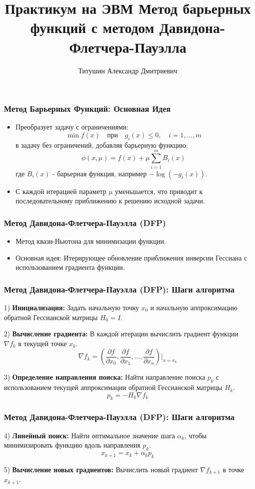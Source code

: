 \documentclass[12pt,pdf,hyperref={unicode}]{beamer}
\title{Практикум на ЭВМ Метод барьерных функций с методом Давидона-Флетчера-Пауэлла}
\author{Титушин Александр Дмитриевич}
\institute{группа 411}
\begin{document}
\newcommand\Rn{\R^n}

\frame{\maketitle}

\begin{frame}
\frametitle{Метод Барьерных Функций: Основная Идея}
\begin{itemize}
    \item Преобразует задачу с ограничениями:
    \[
    \min f(x) \quad \text{при} \quad g_i(x) \leq 0, \quad i=1,...,m
    \]
    в задачу без ограничений, добавляя барьерную функцию:
    \[
    \phi(x, \mu) = f(x) + \mu \sum_{i=1}^m B_i(x)
    \]
    где $B_i(x)$ - барьерная функция, например $-\log(-g_i(x))$.
    \item С каждой итерацией параметр $\mu$ уменьшается, что приводит к последовательному приближению к решению исходной задачи.
\end{itemize}
\end{frame}

\begin{frame}
\frametitle{Метод Давидона-Флетчера-Пауэлла (DFP)}
\begin{itemize}
    \item Метод квази-Ньютона для минимизации функции.
    \item Основная идея: Итерирующее обновление приближения инверсии Гессиана с использованием градиента функции.
\end{itemize}
\end{frame}

\begin{frame}
\frametitle{Метод Давидона-Флетчера-Пауэлла (DFP): Шаги алгоритма}
1) \textbf{Инициализация:} Задать начальную точку $x_0$ и начальную аппроксимацию обратной Гессианской матрицы $H_0 = I$.
    
2) \textbf{Вычисление градиента:} В каждой итерации вычислить градиент функции $\nabla f_k$ в текущей точке $x_k$.
    \[
    \nabla f_k = \left( \frac{\partial f}{\partial x_0}, \frac{\partial f}{\partial x_1}, \ldots, \frac{\partial f}{\partial x_n} \right) \bigg|_{x = x_k}
    \]
    
3) \textbf{Определение направления поиска:} Найти направление поиска $p_k$ с использованием текущей аппроксимации обратной Гессианской матрицы $H_k$.
    \[
    p_k = -H_k \nabla f_k
    \]
\end{frame}

\begin{frame}
\frametitle{Метод Давидона-Флетчера-Пауэлла (DFP): Шаги алгоритма}
4) \textbf{Линейный поиск:} Найти оптимальное значение шага $\alpha_k$, чтобы минимизировать функцию вдоль направления $p_k$.
    \[
    x_{k+1} = x_k + \alpha_k p_k
    \]
    
5) \textbf{Вычисление новых градиентов:} Вычислить новый градиент $\nabla f_{k+1}$ в точке $x_{k+1}$.
\newline 
\end{frame}
\end{document}
